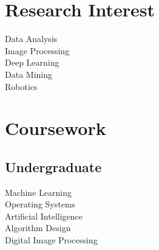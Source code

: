 \documentclass[]{deedy-resume-openfont}
\begin{document}
\begin{minipage}[t]{0.33\textwidth}
\section{Research Interest}
Data Analysis \\
Image Processing \\
Deep Learning \\
Data Mining \\
Robotics
\sectionsep


\section{Coursework}

\subsection{Undergraduate}
Machine Learning \\
Operating Systems \\
Artificial Intelligence \\
Algorithm Design \\
Digital Image Processing \\
\sectionsep



\end{minipage}
\end{document}

